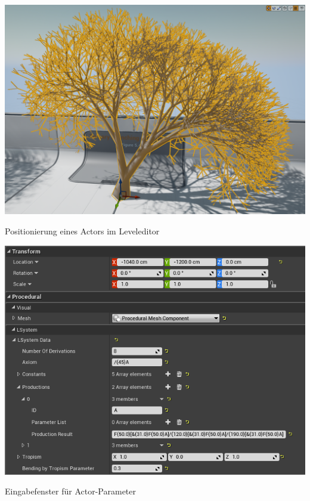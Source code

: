\newpage
\begin{center}
	\includegraphics[height=0.9\textheight]{images/CH1_EditorExample1.png}
	
	Positionierung eines Actors im Leveleditor
\end{center}

\begin{center}
	\includegraphics[height=0.9\textheight]{images/CH1_EditorExample2.png}
	
	Eingabefenster für Actor-Parameter
\end{center}


\iffalse
\newpage
{}
